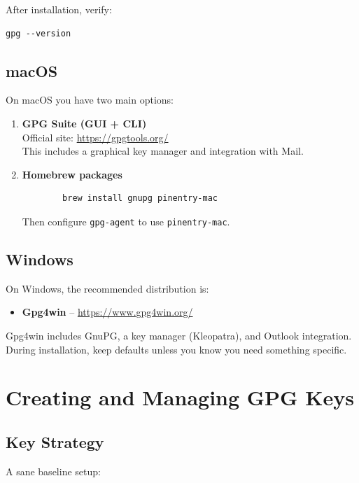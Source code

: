 \documentclass[11pt,a4paper]{article}
\newcommand{\cmd}[1]{\texttt{#1}}
\begin{document}
After installation, verify:

\begin{verbatim}
gpg --version
\end{verbatim}

\subsection{macOS}

On macOS you have two main options:

\begin{enumerate}[noitemsep]
  \item \textbf{GPG Suite (GUI + CLI)}\\
        Official site: \url{https://gpgtools.org/}\\
        This includes a graphical key manager and integration with Mail.
  \item \textbf{Homebrew packages}\\
        \begin{verbatim}
        brew install gnupg pinentry-mac
        \end{verbatim}
        Then configure \cmd{gpg-agent} to use \cmd{pinentry-mac}.
\end{enumerate}

\subsection{Windows}

On Windows, the recommended distribution is:

\begin{itemize}[noitemsep]
  \item \textbf{Gpg4win} -- \url{https://www.gpg4win.org/}
\end{itemize}

Gpg4win includes GnuPG, a key manager (Kleopatra), and Outlook integration. During installation, keep defaults unless you know you need something specific.

\section{Creating and Managing GPG Keys}

\subsection{Key Strategy}

A sane baseline setup:
\end{document}
